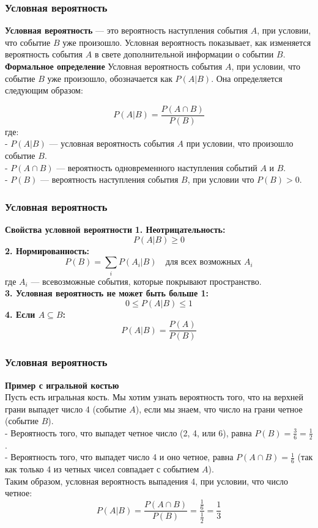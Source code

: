 \documentclass[aspectratio=169]{beamer}
\begin{document}
\begin{frame}
\frametitle{Условная вероятность}
\textbf{Условная вероятность} — это вероятность наступления события \( A \), при условии, что событие \( B \) уже произошло. Условная вероятность показывает, как изменяется вероятность события \( A \) в свете дополнительной информации о событии \( B \).
\newline\\
\textbf{Формальное определение}
\newline
Условная вероятность события \( A \), при условии, что событие \( B \) уже произошло, обозначается как \( P(A | B) \). Она определяется следующим образом:

\[
P(A | B) = \frac{P(A \cap B)}{P(B)}
\]
где:\\
- \( P(A | B) \) — условная вероятность события \( A \) при условии, что произошло событие \( B \).\\
- \( P(A \cap B) \) — вероятность одновременного наступления событий \( A \) и \( B \).\\
- \( P(B) \) — вероятность наступления события \( B \), при условии что \( P(B) > 0 \).
\end{frame}

\begin{frame}
\frametitle{Условная вероятность}
\textbf{Свойства условной вероятности} 
\newline
\textbf{1. Неотрицательность:}
   \[
   P(A | B) \geq 0
   \]
\textbf{2. Нормированность:}
   \[
   P(B) = \sum_{i} P(A_i | B) \quad \text{для всех возможных } A_i
   \]
где \( A_i \) — всевозможные события, которые покрывают пространство.
\newline\\
\textbf{3. Условная вероятность не может быть больше 1:}
   \[
   0 \leq P(A | B) \leq 1
   \]
\textbf{4. Если \( A \subseteq B \):}
   \[
   P(A | B) = \frac{P(A)}{P(B)}
   \]
\end{frame}

\begin{frame}
\frametitle{Условная вероятность}
\textbf{Пример с игральной костью} 
\newline\\
Пусть есть игральная кость. Мы хотим узнать вероятность того, что на верхней грани выпадет число 4 (событие \( A \)), если мы знаем, что число на грани четное (событие \( B \)).
\newline\\
- Вероятность того, что выпадет четное число (2, 4, или 6), равна \( P(B) = \frac{3}{6} = \frac{1}{2} \).
\newline\\
- Вероятность того, что выпадет число 4 и оно четное, равна \( P(A \cap B) = \frac{1}{6} \) (так как только 4 из четных чисел совпадает с событием \( A \)).
\newline\\
Таким образом, условная вероятность выпадения 4, при условии, что число четное:
   \[
   P(A | B) = \frac{P(A \cap B)}{P(B)} = \frac{\frac{1}{6}}{\frac{1}{2}} = \frac{1}{3}
   \]
\end{frame}
\end{document}
